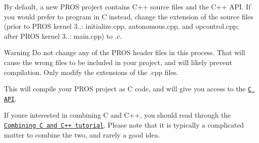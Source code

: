 By default, a new P\+R\+OS project contains C++ source files and the C++ A\+PI. If you would prefer to program in C instead, change the extension of the source files (prior to P\+R\+OS kernel 3..\+: {\ttfamily initialize.\+cpp}, {\ttfamily autonomous.\+cpp}, and {\ttfamily opcontrol.\+cpp}; after P\+R\+OS kernel 3..\+: {\ttfamily main.\+cpp}) to {\ttfamily .c}.

\begin{DoxyWarning}{Warning}
Do not change any of the P\+R\+OS header files in this process. That will cause the wrong files to be included in your project, and will likely prevent compilation. Only modify the extensions of the {\ttfamily .cpp} files.
\end{DoxyWarning}
This will compile your P\+R\+OS project as C code, and will give you access to the \href{../../api/c/index.html}{\tt C A\+PI}.

If you\textquotesingle{}re interested in combining C and C++, you should read through the \href{../general/combining-c-cpp.html}{\tt Combining C and C++ tutorial}. Please note that it is typically a complicated matter to combine the two, and rarely a good idea. 